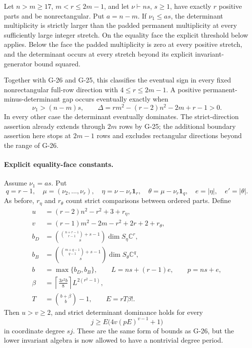 \begin{theorem}
\label{G-27}
Let $n>m\ge17$, $m<r\le2m-1$, and let
$\nu\vdash ns$, $s\ge1$, have exactly $r$ positive parts
and be nonrectangular. Put $a=n-m$. If $\nu_1\le as$,
the determinant multiplicity is strictly larger than the
padded permanent multiplicity at every sufficiently large
integer stretch. On the equality face the explicit threshold
below applies. Below the face the padded multiplicity is zero
at every positive stretch, and the determinant occurs at every
stretch beyond its explicit invariant-generator bound squared.

Together with G-26 and G-25, this classifies the eventual sign
in every fixed nonrectangular full-row direction with
$4\le r\le2m-1$. A positive permanent-minus-determinant gap
occurs eventually exactly when
\[
 \nu_1>(n-m)s,\qquad
 \Delta=rm^2-(r-2)n^2-2m+r-1>0.
\]
In every other case the determinant eventually dominates.
The strict-direction assertion already extends through $2m$
rows by G-25; the additional boundary assertion here stops
at $2m-1$ rows and excludes rectangular directions beyond
the range of G-26.
\end{theorem}

\paragraph{Explicit equality-face constants.}
Assume $\nu_1=as$. Put
\[
 q=r-1,\quad \mu=(\nu_2,\ldots,\nu_r),\quad
 \eta=\nu-\nu_r\mathbf1_r,\quad
 \theta=\mu-\nu_r\mathbf1_q,
 \quad e=|\eta|,\quad e'=|\theta|.
\]
As before, $r_\eta$ and $r_\theta$ count strict comparisons
between ordered parts. Define
\[
 \begin{aligned}
 u&=(r-2)n^2-r^2+3+r_\eta,\\
 v&=(r-1)m^2-2m-r^2+2r+2+r_\theta,\\
 b_D&=\binom{\binom{n+r-1}{r-1}+s-1}{s}
                    \dim S_\eta\mathbb C^r,\\
 b_B&=\binom{\binom{m+q-1}{q-1}+s-1}{s}
                    \dim S_\theta\mathbb C^q,\\
 b&=\max\{b_D,b_B\},\qquad
 L=ns+(r-1)e,\qquad p=ns+e,\\
 \beta&=\left\lceil\frac{3r^2b}{8}\right\rceil
                      L^{2(r^2-1)},\\
 T&=\binom{b+\beta}{b}-1,\qquad E=rT\beta!.
 \end{aligned}
\]
Then $u>v\ge2$, and strict determinant dominance holds for
every
\begin{equation}\label{G27:threshold}
                    j\ge E\bigl(4v(pE)^{v-1}+1\bigr)
\end{equation}
in coordinate degree $sj$. These are the same form of bounds
as G-26, but the lower invariant algebra is now allowed to
have a nontrivial degree period.


